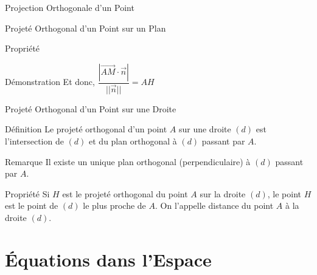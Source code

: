 \documentclass{coursbook}
\begin{document}
\begin{Gpartie}{Projection Orthogonale d'un Point}
\begin{Spartie}{Projeté Orthogonal d'un Point sur un Plan}
\begin{SSSpartie}{Propriété}
\begin{SSSSpartie}{Démonstration}
                    Et donc, $\dfrac{\left\lvert\overrightarrow{AM}\cdot\vec{n}\right\rvert}{\lvert\lvert\vec{n}\rvert\rvert}=AH$
                \end{SSSSpartie}
            \end{SSSpartie}
        \end{Spartie}
        \begin{Spartie}{Projeté Orthogonal d'un Point sur une Droite} 
            \begin{SSpartie}{Définition} 
                Le projeté orthogonal d'un point $A$ sur une droite $(d)$ est l'intersection de $(d)$ et du plan orthogonal à $(d)$ passant par $A$.
            \end{SSpartie}
            \begin{SSpartie}{Remarque} 
                Il existe un unique plan orthogonal (perpendiculaire) à $(d)$ passant par $A$.
            \end{SSpartie}
            \begin{SSpartie}{Propriété} 
                Si $H$ est le projeté orthogonal du point $A$ sur la droite $(d)$, le point $H$ est le point de $(d)$ le plus proche de $A$. On l'appelle distance du point $A$ à la droite $(d)$.
            \end{SSpartie}
        \end{Spartie}
    \end{Gpartie}



    \chapter{Équations dans l'Espace}
\end{document}
